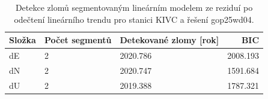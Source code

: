 \begin{table}[H]
\centering
\caption{Detekce zlomů segmentovaným lineárním modelem ze reziduí po odečtení lineárního trendu pro stanici KIVC a řešení gop25wd04.}
\label{tab:gop25wd04_stcd_kivc_detr_weighted_1seg_jumps_piecewise_bic}
\begin{tabular}{lllr}
\toprule
Složka & Počet segmentů & Detekované zlomy [rok] & BIC \\
\midrule
dE & 2 & 2020.786 & 2008.193 \\
dN & 2 & 2020.747 & 1591.684 \\
dU & 2 & 2019.388 & 1787.321 \\
\bottomrule
\end{tabular}
\end{table}
